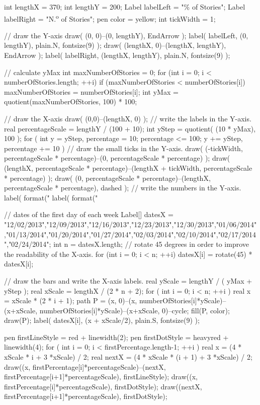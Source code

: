 \begin{asydef}
{  int lengthX = 370;
  int lengthY = 200;
  Label labelLeft = "\% of Stories";
  Label labelRight = "N.\textsuperscript{o} of Stories";
  pen color = yellow;
  int tickWidth = 1;

  // draw the Y-axis
  draw( (0, 0)--(0, lengthY), EndArrow );
  label( labelLeft, (0, lengthY), plain.N,  fontsize(9) );
  draw( (lengthX, 0)--(lengthX, lengthY), EndArrow );
  label( labelRight, (lengthX, lengthY), plain.N, fontsize(9) );
  
  // calculate yMax
  int maxNumberOfStories = 0;
  for (int i = 0; i < numberOfStories.length; ++i)
  	if (maxNumberOfStories < numberOfStories[i])
  		maxNumberOfStories = numberOfStories[i];
  int yMax = quotient(maxNumberOfStories, 100) * 100;
  
  // draw the X-axis
  draw( (0,0)--(lengthX, 0) );
  // write the labels in the Y-axis.
  real percentageScale = lengthY / (100 + 10);
  int yStep = quotient( (10 * yMax), 100 );
  for ( int y = yStep, percentage = 10; percentage <= 100; y += yStep, percentage += 10 ) {
    // draw the small ticks in the Y-axis.
    draw( (-tickWidth, percentageScale * percentage)--(0, percentageScale * percentage) );
    draw( (lengthX, percentageScale * percentage)--(lengthX + tickWidth, percentageScale * percentage) );
	draw( (0, percentageScale * percentage)--(lengthX, percentageScale * percentage), dashed );
    // write the numbers in the Y-axis.
    label( format("%
    label( format("%
  }
  
  // dates of the first day of each week
  Label[] datesX = {"12/02/2013","12/09/2013","12/16/2013","12/23/2013","12/30/2013","01/06/2014","01/13/2014","01/20/2014","01/27/2014","02/03/2014","02/10/2014","02/17/2014","02/24/2014"};
  int n = datesX.length;
  // rotate 45 degrees in order to improve the readability of the X-axis.
  for (int i = 0; i < n; ++i)
    datesX[i] = rotate(45) * datesX[i];

  // draw the bars and write the X-axis labels.
  real yScale = lengthY / ( yMax + yStep );
  real xScale = lengthX / (2 * n + 2);
  for ( int i = 0; i < n; ++i ) { 
    real x = xScale * (2 * i + 1);
    path P = (x, 0)--(x, numberOfStories[i]*yScale)--(x+xScale, numberOfStories[i]*yScale)--(x+xScale, 0)--cycle;
    fill(P, color);
    draw(P);
    label( datesX[i], (x + xScale/2), plain.S, fontsize(9) );
  }


  pen firstLineStyle = red + linewidth(2);
  pen firstDotStyle = heavyred + linewidth(4);  
  for ( int i = 0; i < firstPercentage.length-1; ++i ){
    real x = (4 * xScale * i + 3 *xScale) / 2;
    real nextX = (4 * xScale * (i + 1) + 3 *xScale) / 2;
    draw((x, firstPercentage[i]*percentageScale)--(nextX, firstPercentage[i+1]*percentageScale), firstLineStyle);
    draw((x, firstPercentage[i]*percentageScale), firstDotStyle);
    draw((nextX, firstPercentage[i+1]*percentageScale), firstDotStyle);
  }
  
}
\end{asydef}
